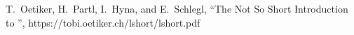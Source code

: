 
\begin{thebibliography}{99} %

T.~Oetiker, H.~Partl, I.~Hyna, and E.~Schlegl,
``The Not So Short Introduction to \LaTeXe'',
https://tobi.oetiker.ch/lshort/lshort.pdf


\end{thebibliography}









